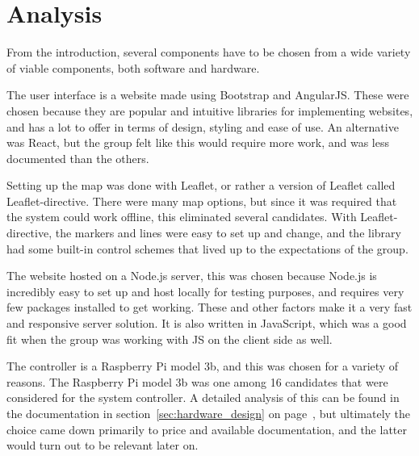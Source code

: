 \chapter{Analysis}

From the introduction, several components have to be chosen from a wide variety of viable components, both software and hardware.

The user interface is a website made using Bootstrap\cite{bootstrap} and AngularJS\cite{angular}. These were chosen because they are popular and intuitive libraries for implementing websites, and has a lot to offer in terms of design, styling and ease of use. An alternative was React, but the group felt like this would require more work, and was less documented than the others. 

Setting up the map was done with Leaflet, or rather a version of Leaflet called Leaflet-directive\cite{leaflet}. There were many map options, but since it was required that the system could work offline, this eliminated several candidates. With Leaflet-directive, the markers and lines were easy to set up and change, and the library had some built-in control schemes that lived up to the expectations of the group.

The website hosted on a Node.js server\cite{nodejs}, this was chosen because Node.js is incredibly easy to set up and host locally for testing purposes, and requires very few packages installed to get working. These and other factors make it a very fast and responsive server solution. It is also written in JavaScript, which was a good fit when the group was working with JS on the client side as well.

The controller is a Raspberry Pi model 3b, and this was chosen for a variety of reasons. The Raspberry Pi model 3b was one among 16 candidates that were considered for the system controller. A detailed analysis of this can be found in the documentation in section~\ref{sec:hardware_design} on page~\pageref{sec:hardware_design}, but ultimately the choice came down primarily to price and available documentation, and the latter would turn out to be relevant later on.

